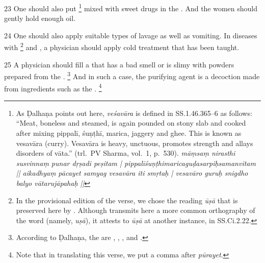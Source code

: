 \begin{translation}
\item [23]
One should also put %
	\footnote{%
	As Ḍalhaṇa points out here, \textit{veśavāra} is defined in SS.1.46.365--6 as follows: “Meat, boneless and steamed, is again pounded on stony slab and cooked after mixing pippalī, śuṇṭhī, marica, jaggery and ghee. This is known as vesavāra (curry). Vesavāra is heavy, unctuous, promotes strength and allays disorders of vāta.” (trl.\ PV Sharma, vol.\ 1, p.\ 530). 
	\textit{māṃsaṃ nirasthi susvinnaṃ punar dṛṣadi peṣitam | pippalīśuṇṭhimaricaguḍasarpiḥsamanvitam || aikadhyaṃ pācayet samyag vesavāra iti smṛtaḥ | vesavāro guruḥ snigdho balyo vātarujāpahaḥ ||}
	} 
mixed with sweet drugs in the . And the women should gently hold enough  oil.%

\item [24]
One should also apply suitable types of lavage as well as vomiting. 
In diseases with %
	\footnote{%
	In the provisional edition of the verse, we chose the reading \textit{ūṣā} that is preserved here by . Although  transmits here a more common orthography of the word (namely, \textit{uṣā}), it attests to \textit{ūṣā} at another instance, in SS.Ci.2.22.%
	} 
and , a physician should apply cold treatment that has been taught.

\item [25]
A physician should fill a  that has a bad smell or is slimy with powders prepared from the .%
	\footnote{%
	According to Ḍalhaṇa, the  are , , ,  and .
	} 
And in such a case, the purifying agent is a decoction made from ingredients such as the .%
	\footnote{%
	Note that in translating this verse, we put a comma after \textit{pūrayet}.%
	}


\end{translation}
